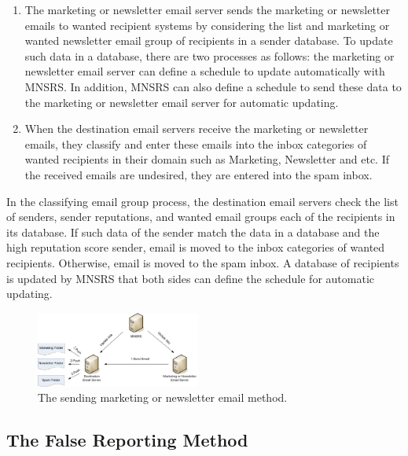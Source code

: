 \documentclass[conference]{IEEEtran}
\begin{document}
\begin{enumerate}
\item The marketing or newsletter email server sends the marketing or newsletter emails to wanted recipient systems by considering the list and marketing or wanted newsletter email group of recipients in a sender database.  
%
To update such data in a database, there are two processes as follows: the marketing or newsletter email server can define a schedule to update automatically with MNSRS.
In addition, MNSRS can also define a schedule to send these data to the marketing or newsletter email server for automatic updating. 
\item When the destination email servers receive the marketing or newsletter emails, they classify and enter these emails into the inbox categories of wanted recipients in their domain such as Marketing, Newsletter and etc. 
%
If the received emails are undesired, they are entered into the spam inbox.
\end{enumerate}
%
In the classifying email group process, the destination email servers check
the list of senders, sender reputations, and wanted email groups each of the recipients in its database.
%
If such data of the sender match the data in a database and the high reputation score sender, email is moved to the inbox categories of wanted recipients.
%
Otherwise, email is moved to the spam inbox.
%
A database of recipients is updated by MNSRS that both sides can define the schedule for automatic updating.

\begin{figure}
\centering
\includegraphics[width=0.48\textwidth]{4.pdf}
\caption{The sending marketing or newsletter email method.} 
\label{fig:SendingMethod}
\end{figure}

\subsection{The False Reporting Method}
\end{document}
